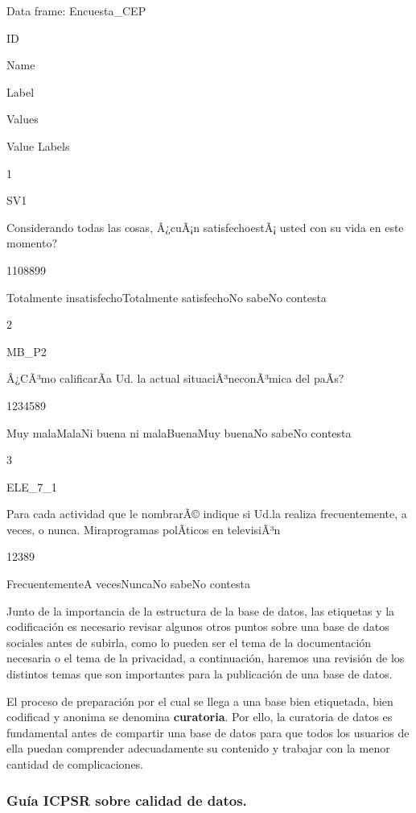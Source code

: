 \documentclass[
  14pt,
]{book}
\begin{document}
Data frame: Encuesta\_CEP

ID

Name

Label

Values

Value Labels

1

SV1

Considerando todas las cosas, Â¿cuÃ¡n satisfechoestÃ¡ usted con su vida en este momento?

1108899

Totalmente insatisfechoTotalmente satisfechoNo sabeNo contesta

2

MB\_P2

Â¿CÃ³mo calificarÃ­a Ud. la actual situaciÃ³neconÃ³mica del paÃ­s?

1234589

Muy malaMalaNi buena ni malaBuenaMuy buenaNo sabeNo contesta

3

ELE\_7\_1

Para cada actividad que le nombrarÃ© indique si Ud.la realiza frecuentemente, a veces, o nunca. Miraprogramas polÃ­ticos en televisiÃ³n

12389

FrecuentementeA vecesNuncaNo sabeNo contesta

Junto de la importancia de la estructura de la base de datos, las etiquetas y la codificación es necesario revisar algunos otros puntos sobre una base de datos sociales antes de subirla, como lo pueden ser el tema de la documentación necesaria o el tema de la privacidad, a continuación, haremos una revisión de los distintos temas que son importantes para la publicación de una base de datos.

El proceso de preparación por el cual se llega a una base bien etiquetada, bien codificad y anonima se denomina \textbf{curatoria}. Por ello, la curatoria de datos es fundamental antes de compartir una base de datos para que todos los usuarios de ella puedan comprender adecuadamente su contenido y trabajar con la menor cantidad de complicaciones.

\hypertarget{guuxeda-icpsr-sobre-calidad-de-datos.}{%
\subsubsection{Guía ICPSR sobre calidad de datos.}\label{guuxeda-icpsr-sobre-calidad-de-datos.}}
\end{document}
